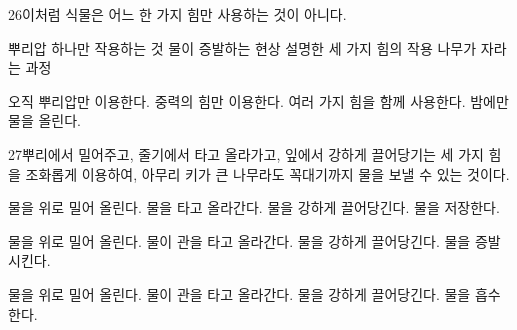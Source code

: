 \documentclass[fs85,seriesRus]{korfarm-base}
\begin{document}
\begin{kfSentenceUnit}{26}{이처럼 식물은 어느 한 가지 힘만 사용하는 것이 아니다.}
\begin{kfChoices}
\kfChoice 뿌리압 하나만 작용하는 것
\kfChoice 물이 증발하는 현상
\kfChoice 설명한 세 가지 힘의 작용
\kfChoice 나무가 자라는 과정
\end{kfChoices}
\begin{kfChoices}
\kfChoice 오직 뿌리압만 이용한다.
\kfChoice 중력의 힘만 이용한다.
\kfChoice 여러 가지 힘을 함께 사용한다.
\kfChoice 밤에만 물을 올린다.
\end{kfChoices}
\end{kfSentenceUnit}

\begin{kfSentenceUnit}{27}{뿌리에서 밀어주고, 줄기에서 타고 올라가고, 잎에서 강하게 끌어당기는 세 가지 힘을 조화롭게 이용하여, 아무리 키가 큰 나무라도 꼭대기까지 물을 보낼 수 있는 것이다.}
\begin{kfChoices}
\kfChoice 물을 위로 밀어 올린다.
\kfChoice 물을 타고 올라간다.
\kfChoice 물을 강하게 끌어당긴다.
\kfChoice 물을 저장한다.
\end{kfChoices}
\begin{kfChoices}
\kfChoice 물을 위로 밀어 올린다.
\kfChoice 물이 관을 타고 올라간다.
\kfChoice 물을 강하게 끌어당긴다.
\kfChoice 물을 증발시킨다.
\end{kfChoices}
\begin{kfChoices}
\kfChoice 물을 위로 밀어 올린다.
\kfChoice 물이 관을 타고 올라간다.
\kfChoice 물을 강하게 끌어당긴다.
\kfChoice 물을 흡수한다.
\end{kfChoices}
\end{kfSentenceUnit}

\kfEndMC
\end{document}
